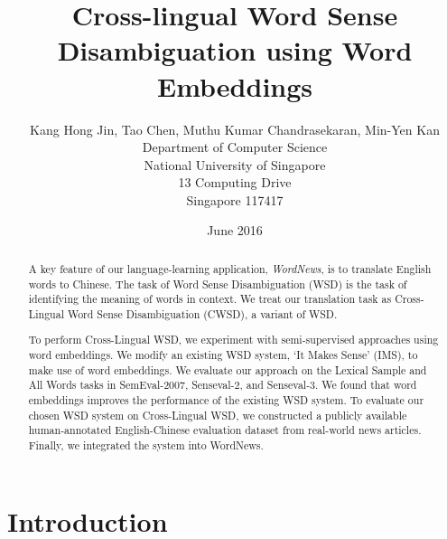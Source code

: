\documentclass[11pt]{article}
\title{Cross-lingual Word Sense Disambiguation using Word Embeddings}
\author{
Kang Hong Jin, Tao Chen,  Muthu Kumar Chandrasekaran, Min-Yen Kan \\
Department of Computer Science \\
National University of Singapore \\
13 Computing Drive \\
Singapore 117417\\}
\date{June 2016}
\begin{document}
\maketitle
\begin{abstract}
  A key feature of our language-learning application, {\it WordNews}, is to 
  translate English words to Chinese. The task of Word Sense Disambiguation 
  (WSD) is the task of identifying the meaning of words in context. We treat 
  our translation task as Cross-Lingual Word Sense Disambiguation (CWSD), 
  a variant of WSD.
  
  To perform Cross-Lingual WSD, we experiment with semi-supervised approaches using word embeddings. 
  We modify an existing WSD system, 
`It Makes Sense' (IMS), 
to make use of word embeddings. 
We evaluate our approach on the Lexical Sample and All Words tasks in SemEval-2007, Senseval-2, and Senseval-3. We found that word embeddings improves the performance of the existing WSD system. 
  To evaluate our chosen WSD system on Cross-Lingual WSD, we constructed a publicly available human-annotated English-Chinese evaluation dataset from
real-world news articles. 
Finally, we integrated the system into WordNews.
\end{abstract}

\section{Introduction}
\label{intro}

%
% 
\end{document}
